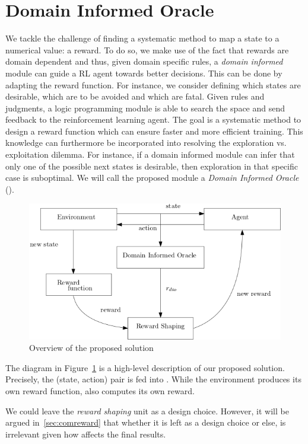 \section{Domain Informed Oracle} 

We tackle the challenge of finding a systematic method to map a state to a numerical value: a reward. 
To do so, we make use of the fact that rewards are domain dependent and thus, given domain specific rules, a \emph{domain informed} module can guide a RL agent towards better decisions. This can be done by 
adapting the reward function. For instance, we consider defining which states are desirable, which are to be avoided and which are fatal. Given rules and judgments, a logic programming module 
is able to search the space and send feedback to the reinforcement learning agent. The goal is a systematic method to design a reward function which can ensure faster and more efficient 
training. This knowledge can furthermore be incorporated into resolving the exploration vs. exploitation dilemma. For instance, if a domain informed module 
can infer that only one of the possible next states is desirable, then exploration in that specific case is suboptimal.  
We will call the proposed module a \emph{Domain Informed Oracle}
(\dio{}).

\begin{figure}[H]
  \centering
  \includegraphics[scale=0.45]{figures/overview.png}
  \caption{Overview of the proposed solution}
  \label{fig:overview}
\end{figure}


The diagram in Figure~\ref{fig:overview} is a high-level description of our proposed solution. 
%
Precisely, the (state, action) pair is fed into \dio{}. While the environment produces its own 
reward function, \dio{} also computes its own reward. 

We could leave the \emph{reward shaping} unit as a design choice.
However, it will be argued in~\ref{sec:comreward}
that whether it is left as a design choice or else, is irrelevant given how \dio{} affects the final results.

